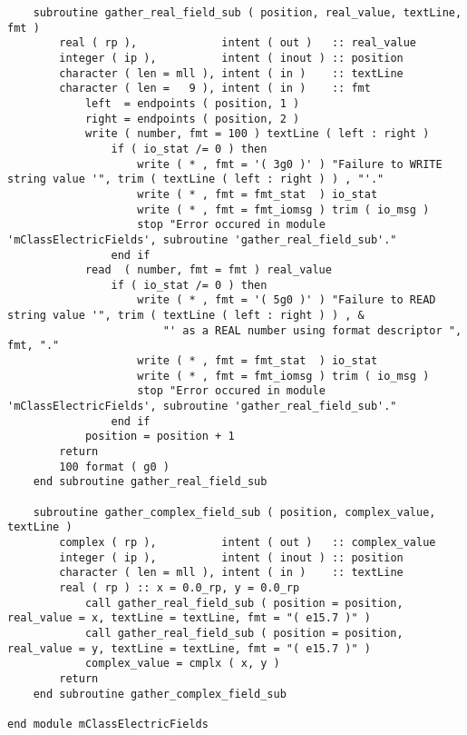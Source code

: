 {{\begin{lstlisting}
    subroutine gather_real_field_sub ( position, real_value, textLine, fmt )
        real ( rp ),             intent ( out )   :: real_value
        integer ( ip ),          intent ( inout ) :: position
        character ( len = mll ), intent ( in )    :: textLine
        character ( len =   9 ), intent ( in )    :: fmt
            left  = endpoints ( position, 1 )
            right = endpoints ( position, 2 )
            write ( number, fmt = 100 ) textLine ( left : right )
                if ( io_stat /= 0 ) then
                    write ( * , fmt = '( 3g0 )' ) "Failure to WRITE string value '", trim ( textLine ( left : right ) ) , "'."
                    write ( * , fmt = fmt_stat  ) io_stat
                    write ( * , fmt = fmt_iomsg ) trim ( io_msg )
                    stop "Error occured in module 'mClassElectricFields', subroutine 'gather_real_field_sub'."
                end if
            read  ( number, fmt = fmt ) real_value
                if ( io_stat /= 0 ) then
                    write ( * , fmt = '( 5g0 )' ) "Failure to READ string value '", trim ( textLine ( left : right ) ) , &
                        "' as a REAL number using format descriptor ", fmt, "."
                    write ( * , fmt = fmt_stat  ) io_stat
                    write ( * , fmt = fmt_iomsg ) trim ( io_msg )
                    stop "Error occured in module 'mClassElectricFields', subroutine 'gather_real_field_sub'."
                end if
            position = position + 1
        return
        100 format ( g0 )
    end subroutine gather_real_field_sub

    subroutine gather_complex_field_sub ( position, complex_value, textLine )
        complex ( rp ),          intent ( out )   :: complex_value
        integer ( ip ),          intent ( inout ) :: position
        character ( len = mll ), intent ( in )    :: textLine
        real ( rp ) :: x = 0.0_rp, y = 0.0_rp
            call gather_real_field_sub ( position = position, real_value = x, textLine = textLine, fmt = "( e15.7 )" )
            call gather_real_field_sub ( position = position, real_value = y, textLine = textLine, fmt = "( e15.7 )" )
            complex_value = cmplx ( x, y )
        return
    end subroutine gather_complex_field_sub

end module mClassElectricFields
\end{lstlisting}
}}

\endinput  %
